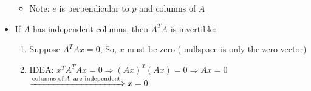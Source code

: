 \documentclass[a4paper,12pt]{article}
\begin{document}
\begin{itemize}
\begin{itemize}
			\item Note: $e$ is perpendicular to $p$ and columns of $A$
		\end{itemize}
		
		\item If $A$ has independent columns, then $A^T A$ is invertible:
		\begin{enumerate}
			\item Suppose $A^T A x = 0 $, So, $x$ must be zero ( nullspace is only the zero vector)
			\item IDEA: $x^T A^T A x = 0 \Rightarrow (Ax)^T (Ax) = 0 \Rightarrow Ax = 0 $\\
			$\xRightarrow{\text{columns of}\, A\,\text{ are independent}}  x = 0$

		\end{enumerate}
\end{itemize}
\end{document}
